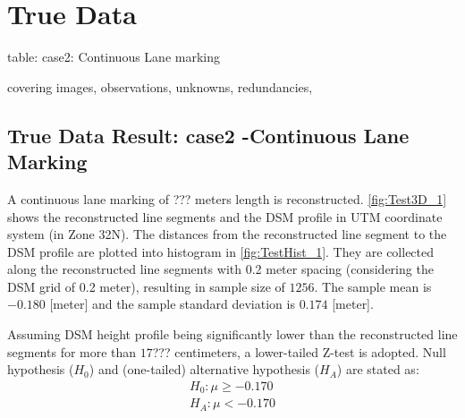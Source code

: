 



\section{True Data}
\label{sec:truedata}

table:
case2: Continuous Lane marking%

covering images, observations, unknowns, redundancies, 





\subsection{True Data Result: case2 -Continuous Lane Marking}
\label{subsec:trueresult-2}

A continuous lane marking of ??? meters length is reconstructed. \cref{fig:Test3D_1} shows the reconstructed line segments and the DSM profile in UTM coordinate system (in Zone 32N). The distances from the reconstructed line segment to the DSM profile are plotted into histogram in \cref{fig:TestHist_1}. They are collected along the reconstructed line segments with 0.2 meter spacing (considering the DSM grid of 0.2 meter), resulting in sample size of $1256$. The sample mean is $-0.180$ [meter] and the sample standard deviation is $0.174$ [meter]. %

Assuming DSM height profile being significantly lower than the reconstructed line segments for more than $17$??? centimeters, a lower-tailed Z-test is adopted. Null hypothesis ($H_0$) and (one-tailed) alternative hypothesis ($H_A$) are stated as:
\begin{equation*}
\begin{split}
H_0: \mu\geq-0.170\\
H_A: \mu<-0.170
\end{split}
\end{equation*}

